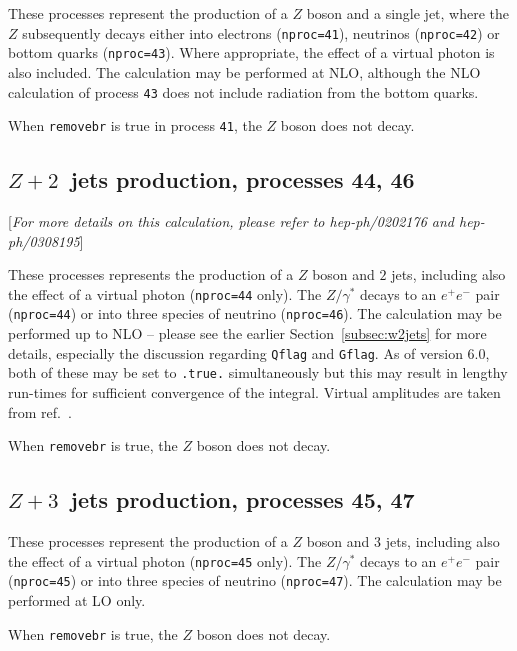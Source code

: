\documentclass[12pt]{article}
\begin{document}
These processes represent the production of a $Z$ boson and a single jet,
where the $Z$ subsequently
decays either into electrons ({\tt nproc=41}), neutrinos ({\tt nproc=42})
or bottom quarks ({\tt nproc=43}). Where appropriate, the effect of a virtual
photon is also included. The calculation may be performed at NLO,
although the NLO calculation of process {\tt 43} does not include radiation
from the bottom quarks.

When {\tt removebr} is true in process {\tt 41}, the $Z$ boson does not decay.

\subsection{$Z+2$~jets production, processes 44, 46}
\label{subsec:z2jets}

\begin{center}
[{\it For more details on this calculation, please refer to \break
 hep-ph/0202176 and hep-ph/0308195}]
\end{center}

These processes represents the production of a $Z$ boson and $2$ jets,
including also the effect of a virtual photon ({\tt nproc=44} only). The $Z/\gamma^*$ decays
to an $e^+ e^-$ pair ({\tt nproc=44}) or into three species of neutrino ({\tt nproc=46}).
The calculation may be performed up to NLO --
please see the earlier Section~\ref{subsec:w2jets} for more details,
especially the discussion regarding {\tt Qflag} and {\tt Gflag}.
As of version 6.0, both of these may be set to {\tt .true.} simultaneously but this
may result in lengthy run-times for sufficient convergence of the integral.
Virtual amplitudes are taken from ref.~\cite{Bern:1997sc}.

When {\tt removebr} is true, the $Z$ boson does not decay.


\subsection{$Z+3$~jets production, processes 45, 47}
\label{subsec:z3jets}

These processes represent the production of a $Z$ boson and $3$ jets,
including also the effect of a virtual photon ({\tt nproc=45} only). The $Z/\gamma^*$ decays
to an $e^+ e^-$ pair ({\tt nproc=45}) or into three species of neutrino ({\tt nproc=47}).
The calculation may be performed at LO only.

When {\tt removebr} is true, the $Z$ boson does not decay.
\end{document}
